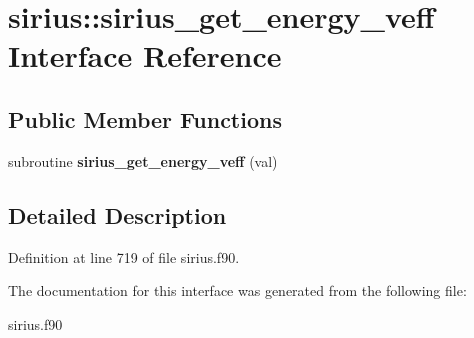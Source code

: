 \hypertarget{interfacesirius_1_1sirius__get__energy__veff}{}\section{sirius\+:\+:sirius\+\_\+get\+\_\+energy\+\_\+veff Interface Reference}
\label{interfacesirius_1_1sirius__get__energy__veff}
\subsection*{Public Member Functions}
\begin{DoxyCompactItemize}
\item 
\hypertarget{interfacesirius_1_1sirius__get__energy__veff_aa8f4f0846fd85966945608c7832b1369}{}subroutine {\bfseries sirius\+\_\+get\+\_\+energy\+\_\+veff} (val)\label{interfacesirius_1_1sirius__get__energy__veff_aa8f4f0846fd85966945608c7832b1369}

\end{DoxyCompactItemize}


\subsection{Detailed Description}


Definition at line 719 of file sirius.\+f90.



The documentation for this interface was generated from the following file\+:\begin{DoxyCompactItemize}
\item 
sirius.\+f90\end{DoxyCompactItemize}
